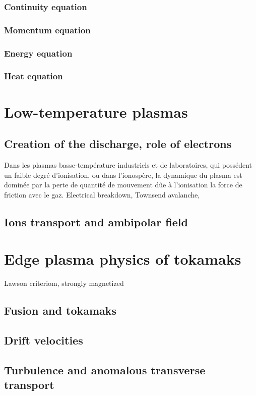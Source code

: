 			\subsubsection{Continuity equation}
			\subsubsection{Momentum equation}
			\subsubsection{Energy equation}
			\subsubsection{Heat equation}
	\section{Low-temperature plasmas}
		\subsection{Creation of the discharge, role of electrons}
		Dans les plasmas basse-température industriels et de laboratoires, qui possédent
			un faible degré d'ionisation, ou dans l'ionospère, la dynamique du plasma est dominée par
			la perte de quantité de mouvement dûe à l'ionisation la force de friction avec le gaz.
		Electrical breakdown, Townsend avalanche, 
		\subsection{Ions transport and ambipolar field}
	\section{Edge plasma physics of tokamaks}
		Lawson criteriom, strongly magnetized
		\subsection{Fusion and tokamaks}
		\subsection{Drift velocities}
		\subsection{Turbulence and anomalous transverse transport}
